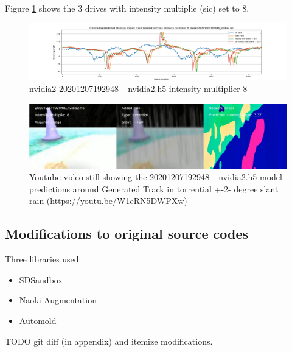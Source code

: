 Figure \ref{fig:sa_GeneratedTrackintensitymultiplier8_20201207192948_nvidia2} shows the 3 drives with intensity multiplie (sic) set to 8.
\begin{figure}[ht]
 \centering 
 \includegraphics[width=\textwidth]{Figures/sa_GeneratedTrackintensitymultiplier8_20201207192948_nvidia2.h5}
 \caption{nvidia2 20201207192948\_ nvidia2.h5 intensity multiplier 8}
 \label{fig:sa_GeneratedTrackintensitymultiplier8_20201207192948_nvidia2} 
\end{figure}

\begin{figure}[ht]
 \centering 
 \includegraphics[width=\textwidth]{Figures/youtube20201207192948_nvidia2torrential20mult_8_h5.png}
 \caption{Youtube video still showing the 20201207192948\_ nvidia2.h5 model predictions around Generated Track in torrential +-2- degree slant rain (\url{https://youtu.be/W1eRN5DWPXw})}
 \label{fig:youtube20201207192948_nvidia2torrential20mult_8_h5} 
\end{figure}



\subsection{Modifications to original source codes}
Three libraries used:
\begin{itemize}
    \item SDSandbox
    \item Naoki Augmentation
    \item Automold
\end{itemize}
TODO git diff (in appendix) and itemize modifications.
    

